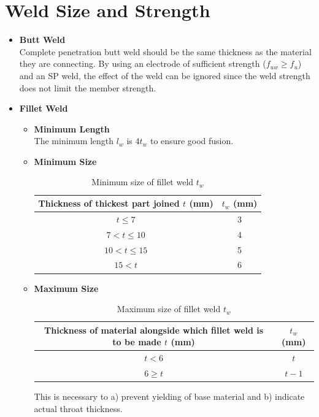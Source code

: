 \section{Weld Size and Strength}
\begin{itemize}
\item \textbf{Butt Weld}\\Complete penetration butt weld should be the same thickness as the material they are connecting. By using an electrode of sufficient strength ($f_{uw}\geqslant{}f_u$) and an SP weld, the effect of the weld can be ignored since the weld strength does not limit the member strength.
\item \textbf{Fillet Weld}
\begin{itemize}
\item \textbf{Minimum Length}\\The minimum length $l_w$ is $4t_w$ to ensure good fusion.
\item \textbf{Minimum Size}
\begin{table}[H]
\centering\footnotesize\caption{Minimum size of fillet weld $t_w$}
\begin{tabular}{cc}
	\toprule
	Thickness of thickest part joined $t$ (\si{\mm}) & $t_w$ (\si{\mm}) \\ \midrule
	                 $t\leqslant7$                   &     \num{3}      \\
	                $7<t\leqslant10$                 &     \num{4}      \\
	               $10<t\leqslant15$                 &     \num{5}      \\
	                     $15<t$                      &     \num{6}      \\ \bottomrule
\end{tabular}
\end{table}
\item \textbf{Maximum Size}
\begin{table}[H]
\centering\footnotesize\caption{Maximum size of fillet weld $t_w$}
\begin{tabular}{cc}
	\toprule
	Thickness of material alongside which fillet weld is to be made $t$ (\si{\mm}) & $t_w$ (\si{\mm}) \\ \midrule
	                                    $t<6$                                      &       $t$        \\
	                               $6\geqslant{}t$                                 &      $t-1$       \\ \bottomrule
\end{tabular}
\end{table}
This is necessary to a) prevent yielding of base material and b) indicate actual throat thickness.
\end{itemize}
\end{itemize}

